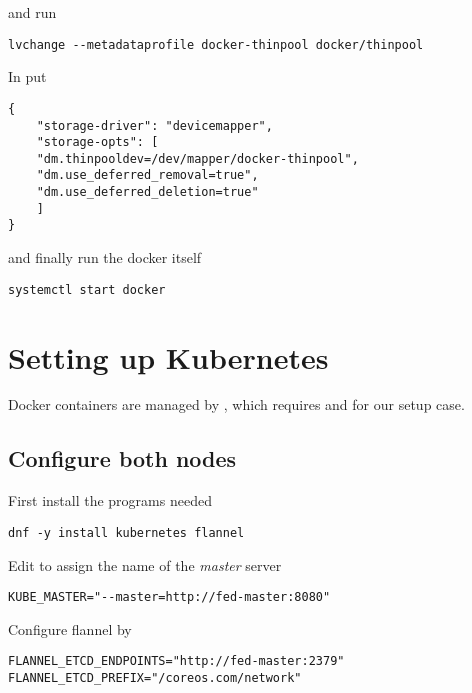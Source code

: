 and run

\begin{lstlisting}
lvchange --metadataprofile docker-thinpool docker/thinpool
\end{lstlisting}

In  put

\begin{lstlisting}
{
    "storage-driver": "devicemapper",
    "storage-opts": [
    "dm.thinpooldev=/dev/mapper/docker-thinpool",
    "dm.use_deferred_removal=true",
    "dm.use_deferred_deletion=true"
    ]
}
\end{lstlisting}

and finally run the docker itself

\begin{lstlisting}
systemctl start docker
\end{lstlisting}

\section{Setting up Kubernetes}
\label{sec:setup-kuber}

Docker containers are managed by ,
which requires  and
 for our setup case.

\subsection{Configure both nodes}
\label{subsec:setup-kuber-both}

First install the programs needed

\begin{lstlisting}
dnf -y install kubernetes flannel
\end{lstlisting}

Edit  to assign the
name of the \emph{master} server

\begin{lstlisting}
KUBE_MASTER="--master=http://fed-master:8080"
\end{lstlisting}

Configure flannel by 

\begin{lstlisting}
FLANNEL_ETCD_ENDPOINTS="http://fed-master:2379"
FLANNEL_ETCD_PREFIX="/coreos.com/network"
\end{lstlisting}

